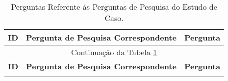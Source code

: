 \begin{center}
\begin{longtable}{
|p{0.03\dimexpr \textwidth-3\arrayrulewidth-3\tabcolsep\relax}|
 p{0.27\dimexpr \textwidth-3\arrayrulewidth-3\tabcolsep\relax}|
 p{0.70\dimexpr \textwidth-3\arrayrulewidth-3\tabcolsep\relax}|
}
\caption{Perguntas Referente às Perguntas de Pesquisa do Estudo de Caso. \label{satisfacao:tabela}} \\

\hline
\textbf{ID} & \textbf{Pergunta de Pesquisa Correspondente} & \textbf{Pergunta} \\
\hline
\endfirsthead

\hline
\multicolumn{3}{|c|}{Continuação da Tabela \ref{satisfacao:tabela}}\\
\hline
\textbf{ID} & \textbf{Pergunta de Pesquisa Correspondente} & \textbf{Pergunta} \\
\hline
\endhead

\hline
\endfoot

\hline


\end{longtable}
\end{center}
